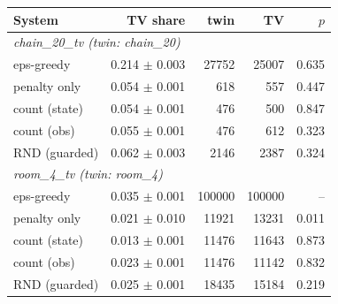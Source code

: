 \begin{tabular}{lrrrr}
\hline
System & TV share & twin & TV & $p$ \\
\hline
\multicolumn{5}{l}{\emph{chain\_20\_tv (twin: chain\_20)}} \\
eps-greedy & 0.214 $\pm$ 0.003 & 27752 & 25007 & 0.635 \\
penalty only & 0.054 $\pm$ 0.001 & 618 & 557 & 0.447 \\
count (state) & 0.054 $\pm$ 0.001 & 476 & 500 & 0.847 \\
count (obs) & 0.055 $\pm$ 0.001 & 476 & 612 & 0.323 \\
RND (guarded) & 0.062 $\pm$ 0.003 & 2146 & 2387 & 0.324 \\
\hline
\multicolumn{5}{l}{\emph{room\_4\_tv (twin: room\_4)}} \\
eps-greedy & 0.035 $\pm$ 0.001 & 100000 & 100000 & -- \\
penalty only & 0.021 $\pm$ 0.010 & 11921 & 13231 & 0.011 \\
count (state) & 0.013 $\pm$ 0.001 & 11476 & 11643 & 0.873 \\
count (obs) & 0.023 $\pm$ 0.001 & 11476 & 11142 & 0.832 \\
RND (guarded) & 0.025 $\pm$ 0.001 & 18435 & 15184 & 0.219 \\
\hline
\end{tabular}
